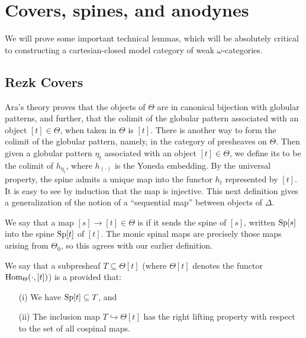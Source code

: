 \section{Covers, spines, and anodynes}

We will prove some important technical lemmas, which will be absolutely critical to constructing a cartesian-closed model category of weak \(\omega\)-categories.   

\subsection{Rezk Covers}

Ara's theory proves that the objects of \(\Theta\) are in canonical bijection with globular patterns, and further, that the colimit of the globular pattern associated with an object \([t]\in \Theta\), when taken in \(\Theta\) is \([t]\). There is another way to form the colimit of the globular pattern, namely, in the category of presheaves on \(\Theta\).  Then given a globular pattern \(\eta_t\) associated with an object \([t]\in \Theta\), we define its  to be the colimit of \(h_{\eta_t}\), where \(h_{(\cdot)}\) is the Yoneda embedding.  By the universal property, the spine admits a unique map into the functor \(h_t\) represented by \([t]\).  It is easy to see by induction that the map is injective.  This next definition gives a generalization of the notion of a ``sequential map'' between objects of \(\Delta\).  

\begin{defn}
We say that a map \([s]\to [t]\in \Theta\) is  if it sends the spine of \([s]\), written \({\operatorname{Sp}}[s]\) into the spine \({\operatorname{Sp}}[t]\) of \([t]\).  The monic spinal maps are precisely those maps arising from \(\Theta_0\), so this agrees with our earlier definition.
\end{defn}

\begin{defn} We say that a subpresheaf \(T\subseteq \Theta[t]\) (where \(\Theta[t]\) denotes the functor \({\operatorname{Hom}}_{\Theta}(\cdot,[t])\)) is a  provided that:
\begin{enumerate}
\item [(i)] We have \({\operatorname{Sp}}[t]\subseteq T\), and
\item [(ii)] The inclusion map \(T\hookrightarrow \Theta[t]\) has the right lifting property with respect to the set of all cospinal maps.    
\end{enumerate}
\end{defn}

